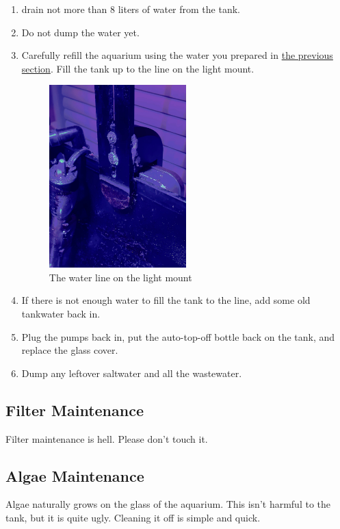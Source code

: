 \documentclass{report}
\begin{document}
\begin{enumerate}
    \item drain not more than 8 liters of water from the tank. 
    \item Do not dump the water yet.
    \item Carefully refill the aquarium using the water you prepared in \hyperref[sec:waterprep]{ the previous section}. Fill 
    the tank up to the line on the light mount. 
    \begin{figure}[H]
        \centering
        \includegraphics[width=0.5\textwidth]{WaterLine.jpg}
        \caption{The water line on the light mount}
    \end{figure}
    
    \item If there is not enough water to fill the tank to the line, add some old tankwater back in. 
    \item Plug the pumps back in, put the auto-top-off bottle back on the tank, and replace the glass cover.
    \item Dump any leftover saltwater and all the wastewater.
\end{enumerate}

\subsection{Filter Maintenance}
Filter maintenance is hell. Please don't touch it. 

\subsection{Algae Maintenance}
\label{sec:algaescraper}
Algae naturally grows on the glass of the aquarium. This isn't harmful to the tank, but it is quite ugly. Cleaning it off is simple and quick. 
\end{document}
